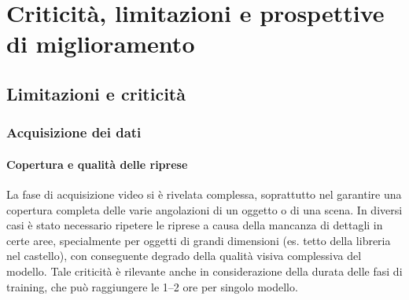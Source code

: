 \chapter{Criticità, limitazioni e prospettive di miglioramento}

\section{Limitazioni e criticità}

\subsection{Acquisizione dei dati}
\subsubsection{Copertura e qualità delle riprese}
La fase di acquisizione video si è rivelata complessa, soprattutto nel garantire una copertura completa delle varie angolazioni di un oggetto o di una scena.  
In diversi casi è stato necessario ripetere le riprese a causa della mancanza di dettagli in certe aree, specialmente per oggetti di grandi dimensioni (es. tetto della libreria nel castello), con conseguente degrado della qualità visiva complessiva del modello.  
Tale criticità è rilevante anche in considerazione della durata delle fasi di training, che può raggiungere le 1--2 ore per singolo modello.

